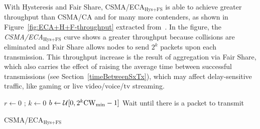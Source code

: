 \documentclass[a4paper,journal]{IEEEtran}
\begin{document}
	With Hysteresis and Fair Share, CSMA/ECA$_{\text{Hys+FS}}$ is able to achieve greater throughput than CSMA/CA and for many more contenders, as shown in Figure~\ref{fig:ECA+H+F-throughput} extracted from~\cite{research2standards}. In the figure, the \emph{CSMA/ECA$_{\text{Hys+FS}}$} curve shows a greater throughput because collisions are eliminated and Fair Share allows nodes to send $2^{k}$ packets upon each transmission. This throughput increase is the result of aggregation via Fair Share, which also carries the effect of raising the average time between successful transmissions (see Section~\ref{timeBetweenSxTx}), which may affect delay-sensitive traffic, like gaming or live video/voice/tv streaming.

	\begin{algorithm}[tb]
	{
	  $r \leftarrow 0$ ; $k \leftarrow 0$\;
	  $b \leftarrow \mathcal{U}[0,2^k\rm{CW}_{min}-1]$\;
	  Wait until there is a packet to transmit\;
	}
	\vspace{0.2cm}
	\caption{CSMA/ECA$_{\text{Hys+FS}}$}
	\label{alg:fullECA}
	\end{algorithm}
\end{document}
